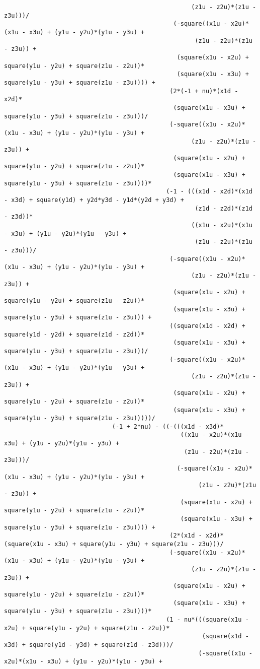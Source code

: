 \begin{lstlisting}
													(z1u - z2u)*(z1u - z3u)))/
											   (-square((x1u - x2u)*(x1u - x3u) + (y1u - y2u)*(y1u - y3u) + 
													 (z1u - z2u)*(z1u - z3u)) + 
												(square(x1u - x2u) + square(y1u - y2u) + square(z1u - z2u))*
												(square(x1u - x3u) + square(y1u - y3u) + square(z1u - z3u)))) + 
											  (2*(-1 + nu)*(x1d - x2d)*
											   (square(x1u - x3u) + square(y1u - y3u) + square(z1u - z3u)))/
											  (-square((x1u - x2u)*(x1u - x3u) + (y1u - y2u)*(y1u - y3u) + 
													(z1u - z2u)*(z1u - z3u)) + 
											   (square(x1u - x2u) + square(y1u - y2u) + square(z1u - z2u))*
											   (square(x1u - x3u) + square(y1u - y3u) + square(z1u - z3u))))*
											 (-1 - (((x1d - x2d)*(x1d - x3d) + square(y1d) + y2d*y3d - y1d*(y2d + y3d) + 
													 (z1d - z2d)*(z1d - z3d))*
													((x1u - x2u)*(x1u - x3u) + (y1u - y2u)*(y1u - y3u) + 
													 (z1u - z2u)*(z1u - z3u)))/
											  (-square((x1u - x2u)*(x1u - x3u) + (y1u - y2u)*(y1u - y3u) + 
													(z1u - z2u)*(z1u - z3u)) + 
											   (square(x1u - x2u) + square(y1u - y2u) + square(z1u - z2u))*
											   (square(x1u - x3u) + square(y1u - y3u) + square(z1u - z3u))) + 
											  ((square(x1d - x2d) + square(y1d - y2d) + square(z1d - z2d))*
											   (square(x1u - x3u) + square(y1u - y3u) + square(z1u - z3u)))/
											  (-square((x1u - x2u)*(x1u - x3u) + (y1u - y2u)*(y1u - y3u) + 
													(z1u - z2u)*(z1u - z3u)) + 
											   (square(x1u - x2u) + square(y1u - y2u) + square(z1u - z2u))*
											   (square(x1u - x3u) + square(y1u - y3u) + square(z1u - z3u)))))/
							  (-1 + 2*nu) - ((-(((x1d - x3d)*
												 ((x1u - x2u)*(x1u - x3u) + (y1u - y2u)*(y1u - y3u) + 
												  (z1u - z2u)*(z1u - z3u)))/
												(-square((x1u - x2u)*(x1u - x3u) + (y1u - y2u)*(y1u - y3u) + 
													  (z1u - z2u)*(z1u - z3u)) + 
												 (square(x1u - x2u) + square(y1u - y2u) + square(z1u - z2u))*
												 (square(x1u - x3u) + square(y1u - y3u) + square(z1u - z3u)))) + 
											  (2*(x1d - x2d)*(square(x1u - x3u) + square(y1u - y3u) + square(z1u - z3u)))/
											  (-square((x1u - x2u)*(x1u - x3u) + (y1u - y2u)*(y1u - y3u) + 
													(z1u - z2u)*(z1u - z3u)) + 
											   (square(x1u - x2u) + square(y1u - y2u) + square(z1u - z2u))*
											   (square(x1u - x3u) + square(y1u - y3u) + square(z1u - z3u))))*
											 (1 - nu*(((square(x1u - x2u) + square(y1u - y2u) + square(z1u - z2u))*
													   (square(x1d - x3d) + square(y1d - y3d) + square(z1d - z3d)))/
													  (-square((x1u - x2u)*(x1u - x3u) + (y1u - y2u)*(y1u - y3u) + 

\end{lstlisting}
